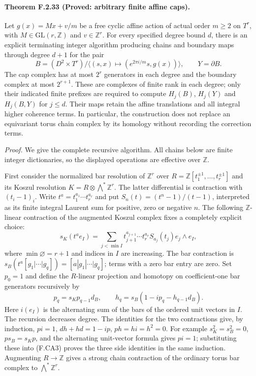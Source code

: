 \paragraph{Theorem F.2.33 (Proved: arbitrary finite affine caps).}
Let $g(x)=Mx+v/m$ be a free cyclic affine action of actual order
$m\geq2$ on $T^r$, with $M\in\mathrm{GL}(r,\mathbb Z)$ and
$v\in\mathbb Z^r$.  For every specified degree bound $d$, there is
an explicit terminating integer algorithm producing chains and
boundary maps through degree $d+1$ for the pair
\[
 B=(D^2\times T^r)/\langle(s,x)\mapsto
 (e^{2\pi i/m}s,g(x))\rangle,
 \qquad Y=\partial B.                                      \tag{F.CA1}
\]
The cap complex has at most $2^r$ generators in each degree and
the boundary complex at most $2^{r+1}$.  These are complexes of
finite rank in each degree; only their indicated finite prefixes
are required to compute $H_j(B)$, $H_j(Y)$ and $H_j(B,Y)$ for
$j\leq d$.  Their maps retain the affine translations and all
integral higher coherence terms.  In particular, the construction
does not replace an equivariant torus chain complex by its
homology without recording the correction terms.

\emph{Proof.}
We give the complete recursive algorithm.  All chains below are
finite integer dictionaries, so the displayed operations are
effective over $\mathbb Z$.

First consider the normalized bar resolution of $\mathbb Z^r$
over $R=\mathbb Z[t_1^{\pm1},\ldots,t_r^{\pm1}]$ and its Koszul
resolution $K=R\otimes\bigwedge^*\mathbb Z^r$.
The latter differential is contraction with $(t_i-1)_i$.
Write $t^a=t_1^{a_1}\cdots t_r^{a_r}$ and put
$S_n(t)=(t^n-1)/(t-1)$, interpreted as its finite integral
Laurent sum for positive, zero or negative $n$.
The following $\mathbb Z$-linear contraction of the augmented
Koszul complex fixes a completely explicit choice:
\[
 s_K(t^a e_I)=
 \sum_{j<\min I}
 t_{j+1}^{a_{j+1}}\cdots t_r^{a_r}S_{a_j}(t_j)
 e_j\wedge e_I,                                           \tag{F.CA2}
\]
where $\min\varnothing=r+1$ and indices in $I$ are increasing.
The bar contraction is
$s_B(t^a[g_1|\cdots|g_q])=[a|g_1|\cdots|g_q]$; terms with a
zero bar entry are zero.  Set $p_0=1$ and define the
$R$-linear projection and homotopy on coefficient-one bar
generators recursively by
\[
 p_q=s_Kp_{q-1}d_B,
 \qquad
 h_q=s_B(1-ip_q-h_{q-1}d_B).                               \tag{F.CA3}
\]
Here $i(e_I)$ is the alternating sum of the bars of the ordered
unit vectors in $I$.  The recursion decreases degree.  The
identities for the two contractions give, by induction,
$pi=1$, $dh+hd=1-ip$, $ph=hi=h^2=0$.
For example $s_K^2=s_B^2=0$, $ps_B=s_Kp$, and the alternating
unit-vector formula gives $pi=1$; substituting these into
(F.CA3) proves the three side identities in the same induction.
Augmenting $R\to\mathbb Z$ gives a strong chain contraction
of the ordinary torus bar complex to $\bigwedge^*\mathbb Z^r$.

